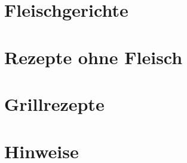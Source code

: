 \documentclass[
	a4paper, %
	BCOR=20mm,
	ngerman, %
	titlepage, %
	parskip=half, %
	final %
]{scrreprt}
\title{\Title\\}
\author{\Large \Author}
\begin{document}
\maketitle  %
\tableofcontents %
\chapter{Fleischgerichte}


















\chapter{Rezepte ohne Fleisch}










\chapter{Grillrezepte}



\chapter{Hinweise}



%
\end{document}
